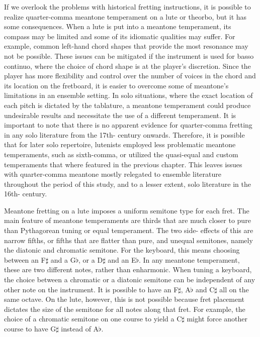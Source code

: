 If we overlook the problems with historical fretting instructions, it is possible to realize
quarter-comma meantone temperament on a lute or theorbo, but it has some consequences.  When a lute
is put into a meantone temperament, its compass may be limited and some of its idiomatic qualities
may suffer.  For example, common left-hand chord shapes that provide the most resonance may not be
possible.  These issues can be mitigated if the instrument is used for basso continuo, where the
choice of chord shape is at the player's discretion.  Since the player has more flexibility and
control over the number of voices in the chord and its location on the fretboard, it is easier to
overcome some of meantone's limitations in an ensemble setting.  In solo situations, where the exact
location of each pitch is dictated by the tablature, a meantone temperament could produce
undesirable results and necessitate the use of a different temperament.  It is important to note
that there is no apparent evidence for quarter-comma fretting in any solo literature from the 17th-
century onwards. Therefore, it is possible that for later solo repertoire, lutenists employed less
problematic meantone temperaments, such as sixth-comma, or utilized the quasi-equal and custom
temperaments that where featured in the previous chapter. This leaves issues with quarter-comma
meantone mostly relegated to ensemble literature throughout the period of this study, and to a
lesser extent, solo literature in the 16th- century.

Meantone fretting on a lute imposes a uniform semitone type for each fret. The main feature of
meantone temperaments are thirds that are much closer to pure than Pythagorean tuning or equal
temperament. The two side- effects of this are narrow fifths, or fifths that are flatter than pure,
and unequal semitones, namely the diatonic and chromatic semitone.  For the keyboard, this means
choosing between an F$\sharp$ and a G$\flat$, or a D$\sharp$ and an E$\flat$.  In any meantone
temperament, these are two different notes, rather than enharmonic.  When tuning a keyboard, the
choice between a chromatic or a diatonic semitone can be independent of any other note on the
instrument. It is possible to have an F$\sharp$, A$\flat$ and C$\sharp$ all on the same octave.  On
the lute, however, this is not possible because fret placement dictates the size of the semitone for
all notes along that fret. For example, the choice of a chromatic semitone on one course to yield a
C$\sharp$ might force another course to have G$\sharp$ instead of A$\flat$.

